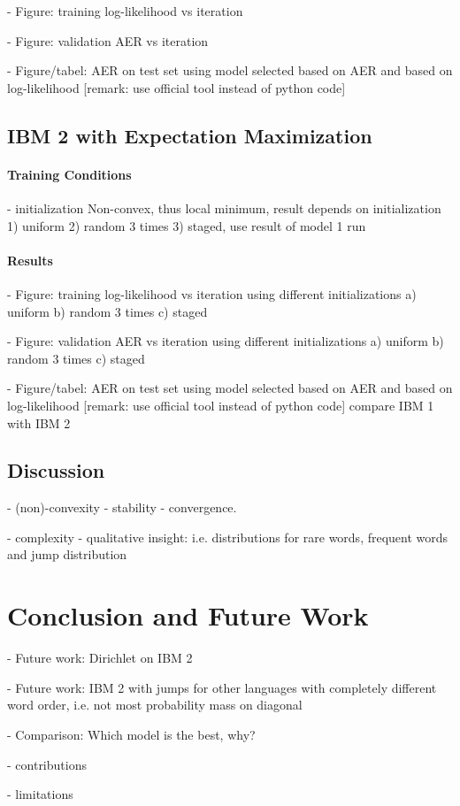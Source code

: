 \documentclass[11pt,a4paper]{article}
\begin{document}
- Figure: training log-likelihood vs iteration

- Figure: validation AER vs iteration

- Figure/tabel: AER on test set using model selected based on AER and based on log-likelihood [remark: use official tool instead of python code]  


\subsection{IBM 2 with Expectation Maximization}
\label{IBM2}

\paragraph{Training Conditions}

- initialization
Non-convex, thus local minimum, result depends on initialization
1) uniform 
2) random 3 times 
3) staged, use result of model 1 run


\paragraph{Results}

- Figure: training log-likelihood vs iteration
using different initializations
a) uniform 
b) random 3 times 
c) staged 

- Figure: validation AER vs iteration
using different initializations
a) uniform 
b) random 3 times 
c) staged 

- Figure/tabel: AER on test set using model selected based on AER and based on log-likelihood [remark: use official tool instead of python code]  
compare IBM 1 with IBM 2

\subsection{Discussion}

- (non)-convexity 
- stability 
- convergence.

- complexity
- qualitative insight: 
i.e. distributions for rare words, frequent words and jump distribution


\section{Conclusion and Future Work}

- Future work: Dirichlet on IBM 2

- Future work: IBM 2 with jumps for other languages with completely different word order,
i.e. not most probability mass on diagonal

- Comparison: Which model is the best, why?

- contributions 

- limitations
\end{document}
